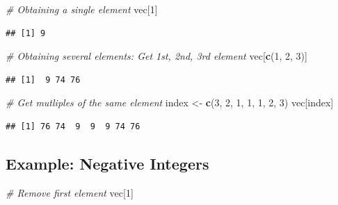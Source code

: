 \documentclass[
]{book}
\newenvironment{Shaded}{\begin{snugshade}}{\end{snugshade}}
\newcommand{\CommentTok}[1]{\textcolor[rgb]{0.56,0.35,0.01}{\textit{#1}}}
\newcommand{\DecValTok}[1]{\textcolor[rgb]{0.00,0.00,0.81}{#1}}
\newcommand{\KeywordTok}[1]{\textcolor[rgb]{0.13,0.29,0.53}{\textbf{#1}}}
\newcommand{\NormalTok}[1]{#1}
\newcommand{\StringTok}[1]{\textcolor[rgb]{0.31,0.60,0.02}{#1}}
\begin{document}
\begin{Shaded}
\begin{Highlighting}[]
\CommentTok{# Obtaining a single element}
\NormalTok{vec[}\DecValTok{1}\NormalTok{]}
\end{Highlighting}
\end{Shaded}

\begin{verbatim}
## [1] 9
\end{verbatim}

\begin{Shaded}
\begin{Highlighting}[]
\CommentTok{# Obtaining several elements: Get 1st, 2nd, 3rd element}
\NormalTok{vec[}\KeywordTok{c}\NormalTok{(}\DecValTok{1}\NormalTok{, }\DecValTok{2}\NormalTok{, }\DecValTok{3}\NormalTok{)]}
\end{Highlighting}
\end{Shaded}

\begin{verbatim}
## [1]  9 74 76
\end{verbatim}

\begin{Shaded}
\begin{Highlighting}[]
\CommentTok{# Get mutliples of the same element}
\NormalTok{index <-}\StringTok{ }\KeywordTok{c}\NormalTok{(}\DecValTok{3}\NormalTok{, }\DecValTok{2}\NormalTok{, }\DecValTok{1}\NormalTok{, }\DecValTok{1}\NormalTok{, }\DecValTok{1}\NormalTok{, }\DecValTok{2}\NormalTok{, }\DecValTok{3}\NormalTok{)}
\NormalTok{vec[index]}
\end{Highlighting}
\end{Shaded}

\begin{verbatim}
## [1] 76 74  9  9  9 74 76
\end{verbatim}

\hypertarget{example-negative-integers}{%
\subsection*{Example: Negative Integers}\label{example-negative-integers}}

\begin{Shaded}
\begin{Highlighting}[]
\CommentTok{# Remove first element}
\NormalTok{vec[}\DecValTok{1}\NormalTok{]}
\end{Highlighting}
\end{Shaded}
\end{document}
